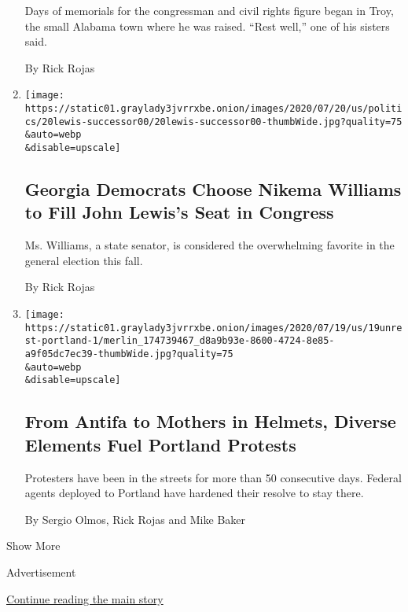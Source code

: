 \begin{enumerate}
  Days of memorials for the congressman and civil rights figure began in
  Troy, the small Alabama town where he was raised. ``Rest well,'' one
  of his sisters said.

  By Rick Rojas
\item
  \href{/2020/07/20/us/politics/john-lewis-successor-congress.html}{}

  \texttt{[image: https://static01.graylady3jvrrxbe.onion/images/2020/07/20/us/politics/20lewis-successor00/20lewis-successor00-thumbWide.jpg?quality=75\\\&auto=webp\\\&disable=upscale]}

  \hypertarget{georgia-democrats-choose-nikema-williams-to-fill-john-lewiss-seat-in-congress}{%
  \subsection{Georgia Democrats Choose Nikema Williams to Fill John
  Lewis's Seat in
  Congress}\label{georgia-democrats-choose-nikema-williams-to-fill-john-lewiss-seat-in-congress}}

  Ms. Williams, a state senator, is considered the overwhelming favorite
  in the general election this fall.

  By Rick Rojas
\item
  \href{/2020/07/19/us/portland-protests.html}{}

  \texttt{[image: https://static01.graylady3jvrrxbe.onion/images/2020/07/19/us/19unrest-portland-1/merlin\_174739467\_d8a9b93e-8600-4724-8e85-a9f05dc7ec39-thumbWide.jpg?quality=75\\\&auto=webp\\\&disable=upscale]}

  \hypertarget{from-antifa-to-mothers-in-helmets-diverse-elements-fuel-portland-protests}{%
  \subsection{From Antifa to Mothers in Helmets, Diverse Elements Fuel
  Portland
  Protests}\label{from-antifa-to-mothers-in-helmets-diverse-elements-fuel-portland-protests}}

  Protesters have been in the streets for more than 50 consecutive days.
  Federal agents deployed to Portland have hardened their resolve to
  stay there.

  By Sergio Olmos, Rick Rojas and Mike Baker
\end{enumerate}

Show More

Advertisement

\protect\hyperlink{after-mid2}{Continue reading the main story}

